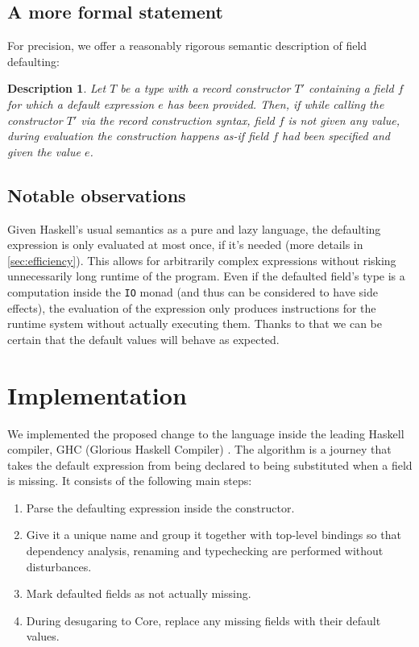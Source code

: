 \documentclass[en]{pracamgr}
\newcommand{\code}[1]{\lstinline[breaklines=true]{#1}}
\begin{document}
\section{A more formal statement}
For precision, we offer a reasonably rigorous semantic description of field defaulting:
\newtheorem{remark}{Description}
\begin{remark}
  \normalfont
  Let $T$ be a type with a record constructor $T'$ containing a field $f$ for which a default expression $e$ has been provided.
  Then, if while calling the constructor $T'$ via the record construction syntax, field $f$ is not given any value, during evaluation the construction happens \textit{as-if} field $f$ had been specified and given the value $e$.
\end{remark}

\section{Notable observations}
Given Haskell's usual semantics as a pure and lazy language, the defaulting expression is only evaluated at most once, if it's needed (more details in \ref{sec:efficiency}).
This allows for arbitrarily complex expressions without risking unnecessarily long runtime of the program. 
Even if the defaulted field's type is a computation inside the \code{IO} monad (and thus can be considered to have side effects), the evaluation of the expression only produces instructions for the runtime system without actually executing them.
Thanks to that we can be certain that the default values will behave as expected.

\chapter{Implementation}\label{ch:impl}

We implemented the proposed change to the language inside the leading Haskell compiler, GHC (Glorious Haskell Compiler) \cite{HudakHaskell}.
The algorithm is a journey that takes the default expression from being declared to being substituted when a field is missing.
It consists of the following main steps:
\begin{enumerate}
  \item Parse the defaulting expression inside the constructor.
  \item Give it a unique name and group it together with top-level bindings so that dependency analysis, renaming and typechecking are performed without disturbances.
  \item Mark defaulted fields as not actually missing.
  \item During desugaring to Core, replace any missing fields with their default values.
\end{enumerate}
\end{document}
